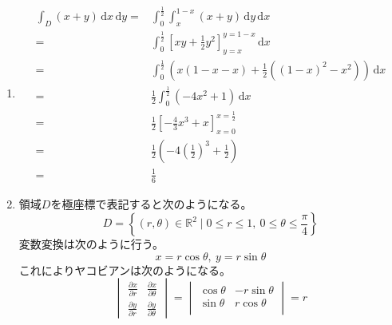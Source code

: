 \documentclass[12pt,b5paper]{ltjsarticle}
\begin{document}
\begin{enumerate}
\begin{enumerate}
        \item
             \begin{align}
              \int_{D}(x+y) \,\mathrm{d}x\,\mathrm{d}y
              =& \int_{0}^{\frac{1}{2}} \int_{x}^{1-x}(x+y) \,\mathrm{d}y\,\mathrm{d}x\\
              =& \int_{0}^{\frac{1}{2}} \left[ xy + \frac{1}{2}y^2 \right]_{y=x}^{y=1-x} \,\mathrm{d}x\\
              =& \int_{0}^{\frac{1}{2}} \left( x(1-x-x) + \frac{1}{2}((1-x)^2-x^2) \right) \,\mathrm{d}x\\
              =&  \frac{1}{2} \int_{0}^{\frac{1}{2}} \left( -4x^2 + 1 \right) \,\mathrm{d}x\\
              =&  \frac{1}{2} \left[ -\frac{4}{3}x^3 +x \right]_{x=0}^{x=\frac{1}{2}}\\
              =&  \frac{1}{2} \left( -4\left(\frac{1}{2}\right)^3 + \frac{1}{2} \right)\\
              =& \frac{1}{6}
             \end{align}

%
%
%


        \item
             領域$D$を極座標で表記すると次のようになる。
             \begin{equation}
              D=\left\{ (r,\theta)\in\mathbb{R}^2 \mid 0\leq r \leq 1,\ 0\leq \theta \leq \frac{\pi}{4} \right\}
             \end{equation}
             変数変換は次のように行う。
             \begin{equation}
              x=r\cos\theta,\ y=r\sin\theta
             \end{equation}
             これによりヤコビアンは次のようになる。
             \begin{equation}
              \begin{vmatrix}
               \frac{\partial x}{\partial r} & \frac{\partial x}{\partial \theta}\\
               \frac{\partial y}{\partial r} & \frac{\partial y}{\partial \theta}
              \end{vmatrix}
              =
              \begin{vmatrix}
               \cos\theta & -r\sin\theta\\
               \sin\theta & r\cos\theta\\
              \end{vmatrix}
              =r
             \end{equation}


\end{enumerate}
\end{enumerate}
\end{document}
